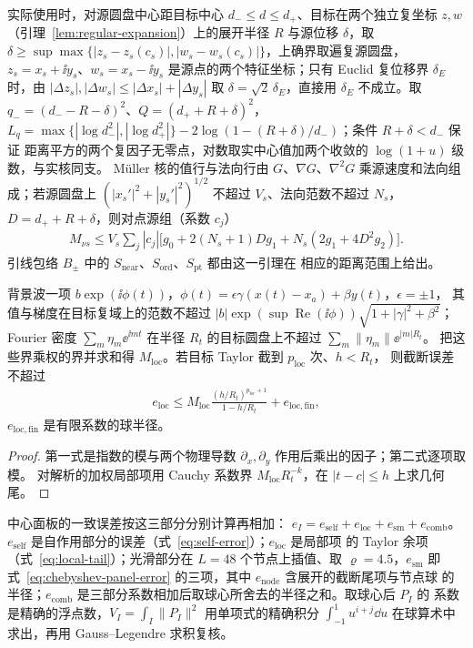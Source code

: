实际使用时，对源圆盘中心距目标中心 $d_-\leq d\leq d_+$、目标在两个独立复坐标 $z,w$
（引理~\ref{lem:regular-expansion}）上的展开半径 $R$ 与源位移 $\delta$，取
$\delta\geq\sup\max\{|z_s-z_s(c_s)|,|w_s-w_s(c_s)|\}$，上确界取遍复源圆盘，
$z_s=x_s+\ii y_s$、$w_s=x_s-\ii y_s$ 是源点的两个特征坐标；只有 Euclid 复位移界 $\delta_E$
时，由 $|\Delta z_s|,|\Delta w_s|\leq|\Delta x_s|+|\Delta y_s|$ 取 $\delta=\sqrt2\,\delta_E$，直接用 $\delta_E$ 不成立。取
$q_-=(d_--R-\delta)^2$、$Q=(d_++R+\delta)^2$，
$L_q=\max\{|\log d_-^2|,|\log d_+^2|\}-2\log(1-(R+\delta)/d_-)$；条件 $R+\delta<d_-$ 保证
距离平方的两个复因子无零点，对数取实中心值加两个收敛的 $\log(1+u)$ 级数，与实核同支。
Müller 核的值行与法向行由 $G$、$\nabla G$、$\nabla^2G$ 乘源速度和法向组成；若源圆盘上
$(|x_s'|^2+|y_s'|^2)^{1/2}$ 不超过 $V_s$、法向范数不超过 $N_s$，$D=d_++R+\delta$，则对点源组（系数 $c_j$）
\begin{align}
  M_{\nu s}\leq V_s\sum_j|c_j|\bigl[g_0+2(N_s+1)Dg_1+N_s(2g_1+4D^2g_2)\bigr].
  \label{eq:kernel-envelope}
\end{align}
引线包络 $B_\pm$ 中的 $S_{\mathrm{near}}$、$S_{\mathrm{ord}}$、$S_{\mathrm{pt}}$ 都由这一引理在
相应的距离范围上给出。

\begin{lemma}[局部项]
  \label{lem:local-terms}
  背景波一项 $b\exp(\ii\phi(t))$，$\phi(t)=\epsilon\gamma(x(t)-x_a)+\beta y(t)$，$\epsilon=\pm1$，
  其值与梯度在目标复域上的范数不超过
  $|b|\exp(\sup\operatorname{Re}(\ii\phi))\sqrt{1+|\gamma|^2+\beta^2}$；Fourier 密度
  $\sum_m\eta_m\ee^{\ii mt}$ 在半径 $R_t$ 的目标圆盘上不超过 $\sum_m\lVert\eta_m\rVert\ee^{|m|R_t}$。
  把这些界乘权的界并求和得 $M_{\mathrm{loc}}$。若目标 Taylor 截到 $p_{\mathrm{loc}}$ 次、$h<R_t$，
  则截断误差不超过
  \begin{align}
    e_{\mathrm{loc}}\leq M_{\mathrm{loc}}\frac{(h/R_t)^{p_{\mathrm{loc}}+1}}{1-h/R_t}
    +e_{\mathrm{loc,fin}},
    \label{eq:local-tail}
  \end{align}
  $e_{\mathrm{loc,fin}}$ 是有限系数的球半径。
\end{lemma}

\begin{proof}
  第一式是指数的模与两个物理导数 $\partial_x,\partial_y$ 作用后乘出的因子；第二式逐项取模。
  对解析的加权局部项用 Cauchy 系数界 $M_{\mathrm{loc}}R_t^{-k}$，在 $|t-c|\leq h$ 上求几何尾。
\end{proof}
中心面板的一致误差按这三部分分别计算再相加：
$e_I=e_{\mathrm{self}}+e_{\mathrm{loc}}+e_{\mathrm{sm}}+e_{\mathrm{comb}}$。$e_{\mathrm{self}}$
是自作用部分的误差（式~\eqref{eq:self-error}）；$e_{\mathrm{loc}}$ 是局部项
的 Taylor 余项（式~\eqref{eq:local-tail}）；光滑部分在 $L=48$ 个节点上插值、取 $\varrho=4.5$，$e_{\mathrm{sm}}$ 即
式~\eqref{eq:chebyshev-panel-error} 的三项，其中 $e_{\mathrm{node}}$ 含展开的截断尾项与节点球
的半径；$e_{\mathrm{comb}}$ 是三部分系数相加后取球心所舍去的半径之和。取球心后 $P_I$ 的
系数是精确的浮点数，$V_I=\int_I\lVert P_I\rVert^2$ 用单项式的精确积分
$\int_{-1}^1u^{i+j}\dd u$ 在球算术中求出，再用 Gauss--Legendre 求积复核。

